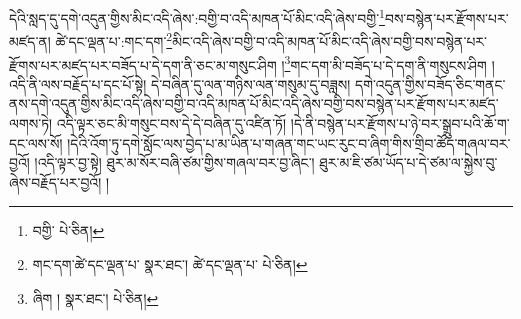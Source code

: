 དེའི་སླད་དུ་དགེ་འདུན་གྱིས་མིང་འདི་ཞེས་:བགྱི་བ་འདི་མཁན་པོ་མིང་འདི་ཞེས་བགྱི་\footnote{བགྱི་  པེ་ཅིན། }བས་བསྙེན་པར་རྫོགས་པར་མཛད་ན། ཚེ་དང་ལྡན་པ་:གང་དག་\footnote{གང་དག་ཚེ་དང་ལྡན་པ་  སྣར་ཐང་། ཚེ་དང་ལྡན་པ་  པེ་ཅིན། }མིང་འདི་ཞེས་བགྱི་བ་འདི་མཁན་པོ་མིང་འདི་ཞེས་བགྱི་བས་བསྙེན་པར་རྫོགས་པར་མཛད་པར་བཟོད་པ་དེ་དག་ནི་ཅང་མ་གསུང་ཤིག །\footnote{ཞིག །  སྣར་ཐང་།  པེ་ཅིན། }གང་དག་མི་བཟོད་པ་དེ་དག་ནི་གསུངས་ཤིག །འདི་ནི་ལས་བརྗོད་པ་དང་པོ་སྟེ། དེ་བཞིན་དུ་ལན་གཉིས་ལན་གསུམ་དུ་བཟླས། དགེ་འདུན་གྱིས་བཟོད་ཅིང་གནང་ནས་དགེ་འདུན་གྱིས་མིང་འདི་ཞེས་བགྱི་བ་འདི་མཁན་པོ་མིང་འདི་ཞེས་བགྱི་བས་བསྙེན་པར་རྫོགས་པར་མཛད་ལགས་ཏེ། འདི་ལྟར་ཅང་མི་གསུང་བས་དེ་དེ་བཞིན་དུ་འཛིན་ཏོ། །དེ་ནི་བསྙེན་པར་རྫོགས་པ་ཉེ་བར་སྒྲུབ་པའི་ཆོ་ག་དང་ལས་སོ། །དེའི་འོག་ཏུ་དགེ་སློང་ལས་བྱེད་པ་མ་ཡིན་པ་གཞན་གང་ཡང་རུང་བ་ཞིག་གིས་གྲིབ་ཚོད་གཞལ་བར་བྱའོ། །འདི་ལྟར་བྱ་སྟེ། ཐུར་མ་སོར་བཞི་ཙམ་གྱིས་གཞལ་བར་བྱ་ཞིང་། ཐུར་མ་ཇི་ཙམ་ཡོད་པ་དེ་ཙམ་ལ་སྐྱེས་བུ་ཞེས་བརྗོད་པར་བྱའོ། །
